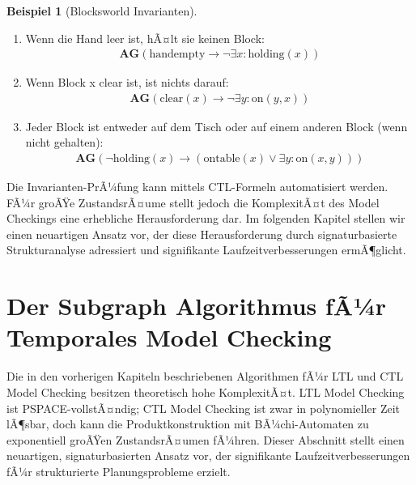﻿\documentclass[a4paper,12pt]{article}
\theoremstyle{definition}
\newtheorem{beispiel}{Beispiel}[section]
\begin{document}
\begin{beispiel}[Blocksworld Invarianten]
	\begin{enumerate}
		\item Wenn die Hand leer ist, hÃ¤lt sie keinen Block:
		\begin{align}
		\mathbf{AG}(\text{handempty} \to \neg\exists x: \text{holding}(x))
		\end{align}
		
		\item Wenn Block x clear ist, ist nichts darauf:
		\begin{align}
		\mathbf{AG}(\text{clear}(x) \to \neg\exists y: \text{on}(y, x))
		\end{align}
		
		\item Jeder Block ist entweder auf dem Tisch oder auf einem anderen Block (wenn nicht gehalten):
		\begin{align}
		\mathbf{AG}(\neg\text{holding}(x) \to (\text{ontable}(x) \lor \exists y: \text{on}(x, y)))
		\end{align}
	\end{enumerate}
\end{beispiel}

Die Invarianten-PrÃ¼fung kann mittels CTL-Formeln automatisiert werden. FÃ¼r groÃŸe ZustandsrÃ¤ume stellt jedoch die KomplexitÃ¤t des Model Checkings eine erhebliche Herausforderung dar. Im folgenden Kapitel stellen wir einen neuartigen Ansatz vor, der diese Herausforderung durch signaturbasierte Strukturanalyse adressiert und signifikante Laufzeitverbesserungen ermÃ¶glicht.


\section{Der Subgraph Algorithmus fÃ¼r Temporales Model Checking}

Die in den vorherigen Kapiteln beschriebenen Algorithmen fÃ¼r LTL und CTL Model Checking besitzen theoretisch hohe KomplexitÃ¤t. LTL Model Checking ist PSPACE-vollstÃ¤ndig; CTL Model Checking ist zwar in polynomieller Zeit lÃ¶sbar, doch kann die Produktkonstruktion mit BÃ¼chi-Automaten zu exponentiell groÃŸen ZustandsrÃ¤umen fÃ¼hren. Dieser Abschnitt stellt einen neuartigen, signaturbasierten Ansatz vor, der signifikante Laufzeitverbesserungen fÃ¼r strukturierte Planungsprobleme erzielt.
\end{document}

